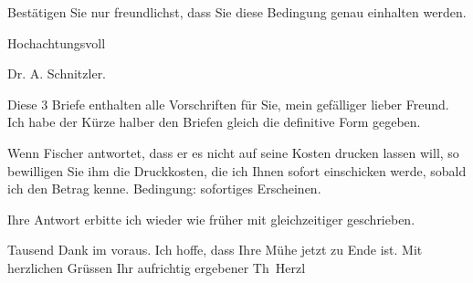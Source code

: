 \pstart
           Bestätigen Sie nur freundlichst, dass Sie diese Bedingung genau einhalten werden.\pend
           
\pstart
           \centering{}Hochachtungsvoll\pend
           
\pstart
           \raggedleft{}Dr. A. Schnitzler.\pend
           
\pstart
           Diese 3 Briefe enthalten alle Vorschriften für Sie, mein gefälliger lieber Freund.
               Ich habe der Kürze {\pb}halber den Briefen
               gleich die definitive Form gegeben.\pend
           
\pstart
           Wenn Fischer antwortet, dass er es nicht auf
                   seine Kosten drucken lassen will, so
               bewilligen Sie ihm die Druckkosten, die ich Ihnen sofort einschicken werde, sobald
               ich den Betrag kenne. Bedingung: sofortiges Erscheinen.\pend
           
\pstart
           Ihre Antwort erbitte ich wieder wie früher \label{K_L03856-7v}\label{K_L03856-7} mit
               gleichzeitiger \label{K_L03856-8v}\label{K_L03856-8}
               geschrieben.\pend
           
\pstart
           Tausend Dank im voraus. Ich hoffe, dass Ihre Mühe jetzt zu Ende ist.\pend
           \pstart Mit herzlichen Grüssen Ihr aufrichtig ergebener \spacefill\mbox{Th Herzl}\pend{}\endnumbering{}
\begin{anhang}
\end{anhang}\newcommand{\dateiname}{L03856}\newcommand{\titel}{Theodor Herzl an Arthur Schnitzler, 3. 4. 1895}\newcommand{\editorInnen}{Selma Jahnke und Martin Anton Müller}
